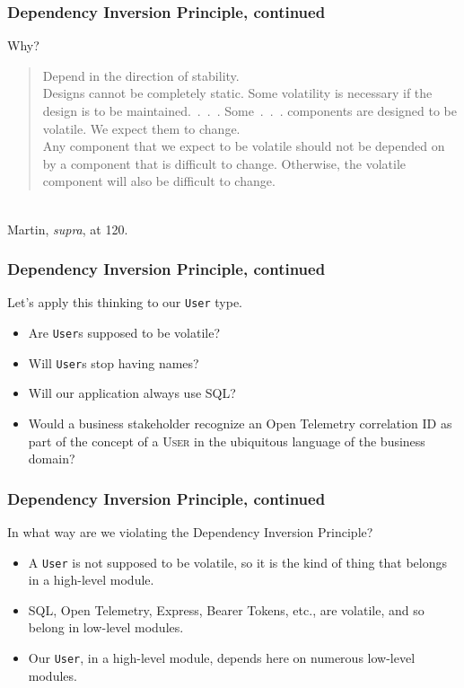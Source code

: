 \documentclass[aspectratio=169]{beamer}
\begin{document}
\begin{frame}
  \frametitle{Dependency Inversion Principle, continued}
  Why?
  \vspace{1em}
  \\
  \begin{quote}
    Depend in the direction of stability. \\

    Designs cannot be completely static. Some volatility is necessary if the
    design is to be maintained.~.~.~. Some~.~.~. components are designed to be
    volatile.  We expect them to change. \\

    Any component that we expect to be volatile should not be depended on by a
    component that is difficult to change.  Otherwise, the volatile component
    will also be difficult to change.
  \end{quote}\\
  \vspace{1em}
  Martin, \textit{supra}, at 120.
\end{frame}

\begin{frame}
  \frametitle{Dependency Inversion Principle, continued}
  Let's apply this thinking to our \texttt{User} type.

  \begin{itemize}
    \item Are \texttt{User}s supposed to be volatile?
    \item Will \texttt{User}s stop having names?
    \item Will our application always use SQL?
    \item Would a business stakeholder recognize an Open Telemetry correlation
          ID as part of the concept of a \textsc{User} in the ubiquitous
          language of the business domain?
  \end{itemize}
\end{frame}

\begin{frame}
  \frametitle{Dependency Inversion Principle, continued}
  In what way are we violating the Dependency Inversion Principle?
  \begin{itemize}
    \item A \texttt{User} is not supposed to be volatile, so it is the kind of
          thing that belongs in a high-level module.
    \item SQL, Open Telemetry, Express, Bearer Tokens, etc., are volatile,
          and so belong in low-level modules.
    \item Our \texttt{User}, in a high-level module, depends here on numerous
          low-level modules.
  \end{itemize}
\end{frame}
\end{document}
